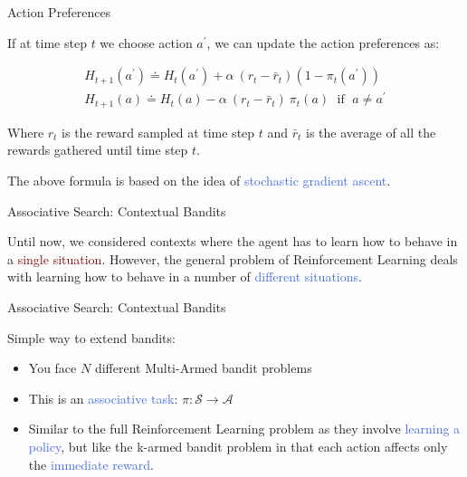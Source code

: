 \documentclass{beamer}
\begin{document}
\begin{frame}{Action Preferences}

If at time step $t$ we choose action $a^{\prime}$, we can update the action preferences as:


\begin{align*}
H_{t+1}(a^{\prime}) \doteq H_t(a^{\prime}) + \alpha \: (r_t - \bar r_t) (1 - \pi_t(a^{\prime}))\\
H_{t+1}(a) \doteq H_t(a) - \alpha \:  (r_t - \bar r_t) \: \pi_t(a) \; \text{ if } \; a \neq a^{\prime}
\end{align*}

\vspace{2mm}

Where $r_t$ is the reward sampled at time step $t$ and $\bar r_t$ is the average of all the rewards gathered until time step $t$.

\vspace{2mm}

The above formula is based on the idea of \textcolor{RoyalBlue}{stochastic gradient ascent}.


\end{frame}

\begin{frame}{Associative Search: Contextual Bandits}

Until now, we considered contexts where the agent has to learn how to behave in a \textcolor{Maroon}{single situation}.
However, the general problem of Reinforcement Learning deals with learning how to behave in a number of \textcolor{RoyalBlue}{different situations}.

\end{frame}

\begin{frame}{Associative Search: Contextual Bandits}

Simple way to extend bandits:

\vspace{2mm}

\begin{itemize}
    \item You face $N$ different Multi-Armed bandit problems%
    \item This is an \textcolor{RoyalBlue}{associative task}: $\pi: \mathcal{S}\rightarrow \mathcal{A}$
    \item Similar to the full Reinforcement Learning problem as they involve \textcolor{RoyalBlue}{learning a policy}, but like the k-armed bandit problem in that each action affects only the \textcolor{RoyalBlue}{immediate reward}.
\end{itemize}

\end{frame}
\end{document}
